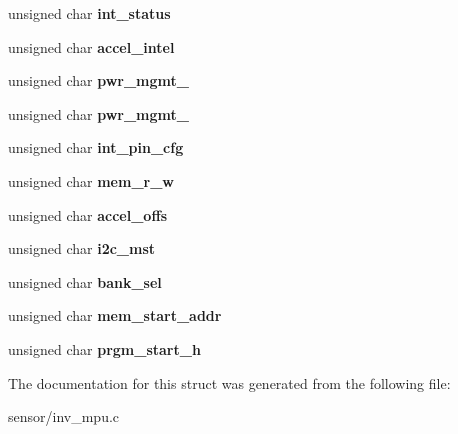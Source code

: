 \begin{DoxyCompactItemize}
\item 
unsigned char {\bfseries int\+\_\+status}\hypertarget{structgyro__reg__s_a39621694d9d5d0c0488c66fa8d088562}{}\label{structgyro__reg__s_a39621694d9d5d0c0488c66fa8d088562}

\item 
unsigned char {\bfseries accel\+\_\+intel}\hypertarget{structgyro__reg__s_a9c4b97b2bf0f2fcee9538e74fcaf5c3f}{}\label{structgyro__reg__s_a9c4b97b2bf0f2fcee9538e74fcaf5c3f}

\item 
unsigned char {\bfseries pwr\+\_\+mgmt\+\_}\hypertarget{structgyro__reg__s_ad746a196c317f0f4d557a92b9eb98d34}{}\label{structgyro__reg__s_ad746a196c317f0f4d557a92b9eb98d34}

\item 
unsigned char {\bfseries pwr\+\_\+mgmt\+\_}\hypertarget{structgyro__reg__s_adc9ae0e35f199b3349174ac09e219ecb}{}\label{structgyro__reg__s_adc9ae0e35f199b3349174ac09e219ecb}

\item 
unsigned char {\bfseries int\+\_\+pin\+\_\+cfg}\hypertarget{structgyro__reg__s_a135c6ee7cb6bdbf6ef9471ce5a6e1724}{}\label{structgyro__reg__s_a135c6ee7cb6bdbf6ef9471ce5a6e1724}

\item 
unsigned char {\bfseries mem\+\_\+r\+\_\+w}\hypertarget{structgyro__reg__s_a1e6aa9b45ef18f1e5f6369c6383e1f0f}{}\label{structgyro__reg__s_a1e6aa9b45ef18f1e5f6369c6383e1f0f}

\item 
unsigned char {\bfseries accel\+\_\+offs}\hypertarget{structgyro__reg__s_a29bdc7a4514a6d9714e6f95958272a21}{}\label{structgyro__reg__s_a29bdc7a4514a6d9714e6f95958272a21}

\item 
unsigned char {\bfseries i2c\+\_\+mst}\hypertarget{structgyro__reg__s_af48ab798d6b786068dfbba8bb176bf1e}{}\label{structgyro__reg__s_af48ab798d6b786068dfbba8bb176bf1e}

\item 
unsigned char {\bfseries bank\+\_\+sel}\hypertarget{structgyro__reg__s_ac5fa957c7e1347ce8cf61f4a5fc52a5c}{}\label{structgyro__reg__s_ac5fa957c7e1347ce8cf61f4a5fc52a5c}

\item 
unsigned char {\bfseries mem\+\_\+start\+\_\+addr}\hypertarget{structgyro__reg__s_ae2cfd68006c94f82add6eab04990c73b}{}\label{structgyro__reg__s_ae2cfd68006c94f82add6eab04990c73b}

\item 
unsigned char {\bfseries prgm\+\_\+start\+\_\+h}\hypertarget{structgyro__reg__s_a0813e85e389743e828cc84c5b903ada1}{}\label{structgyro__reg__s_a0813e85e389743e828cc84c5b903ada1}

\end{DoxyCompactItemize}


The documentation for this struct was generated from the following file\+:\begin{DoxyCompactItemize}
\item 
sensor/inv\+\_\+mpu.\+c\end{DoxyCompactItemize}
